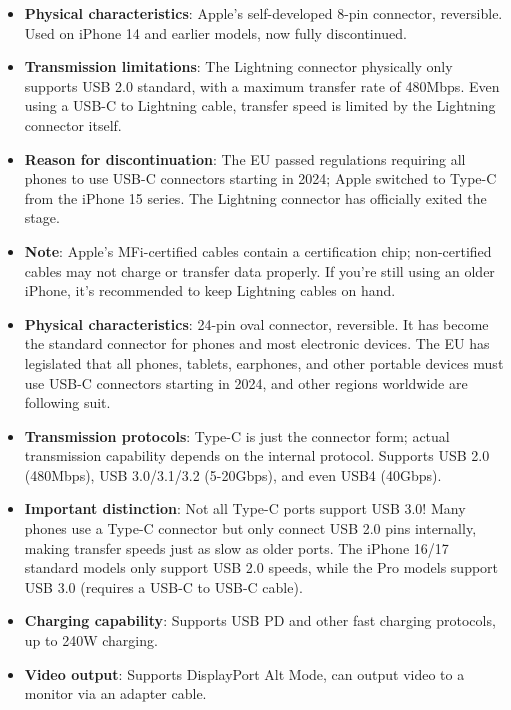 \begin{itemize}
  \item \textbf{Physical characteristics}: Apple's self-developed 8-pin connector, reversible. Used on iPhone 14 and earlier models, now fully discontinued.
  \item \textbf{Transmission limitations}: The Lightning connector physically only supports USB 2.0 standard, with a maximum transfer rate of 480Mbps. Even using a USB-C to Lightning cable, transfer speed is limited by the Lightning connector itself.
  \item \textbf{Reason for discontinuation}: The EU passed regulations requiring all phones to use USB-C connectors starting in 2024; Apple switched to Type-C from the iPhone 15 series. The Lightning connector has officially exited the stage.
  \item \textbf{Note}: Apple's MFi-certified cables contain a certification chip; non-certified cables may not charge or transfer data properly. If you're still using an older iPhone, it's recommended to keep Lightning cables on hand.
\end{itemize}


\begin{itemize}
  \item \textbf{Physical characteristics}: 24-pin oval connector, reversible. It has become the standard connector for phones and most electronic devices. The EU has legislated that all phones, tablets, earphones, and other portable devices must use USB-C connectors starting in 2024, and other regions worldwide are following suit.
  \item \textbf{Transmission protocols}: Type-C is just the connector form; actual transmission capability depends on the internal protocol. Supports USB 2.0 (480Mbps), USB 3.0/3.1/3.2 (5-20Gbps), and even USB4 (40Gbps).
  \item \textbf{Important distinction}: Not all Type-C ports support USB 3.0! Many phones use a Type-C connector but only connect USB 2.0 pins internally, making transfer speeds just as slow as older ports. The iPhone 16/17 standard models only support USB 2.0 speeds, while the Pro models support USB 3.0 (requires a USB-C to USB-C cable).
  \item \textbf{Charging capability}: Supports USB PD and other fast charging protocols, up to 240W charging.
  \item \textbf{Video output}: Supports DisplayPort Alt Mode, can output video to a monitor via an adapter cable.
\end{itemize}

